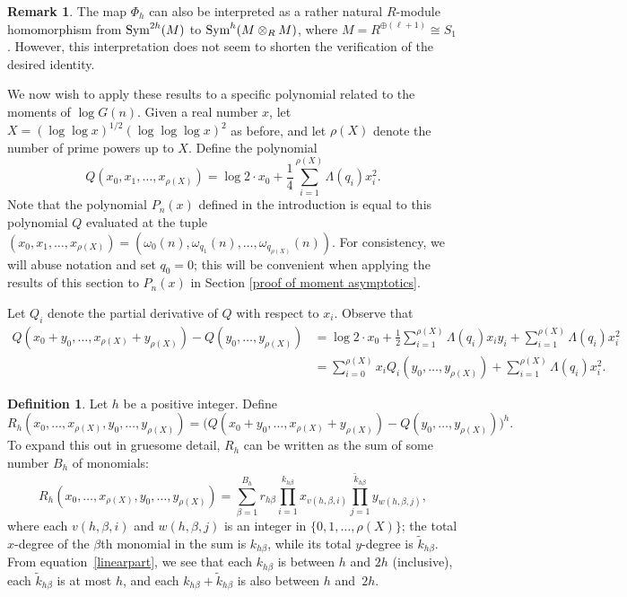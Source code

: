 \documentclass[12pt,reqno]{amsart}
\theoremstyle{definition}
\newtheorem{definition}[theorem]{Definition}
\newtheorem*{remark}{Remark}
\begin{document}
\begin{remark}
\newcommand{\Sym}{\mathop{\rm Sym}}
The map $\Phi_h$ can also be interpreted as a rather natural $R$-module homomorphism from $\Sym^{2h}(M)$ to $\Sym^h(M\otimes_R M)$, where $M = R^{\oplus(\ell+1)} \cong S_1$. However, this interpretation does not seem to shorten the verification of the desired identity.
\end{remark}

We now wish to apply these results to a specific polynomial related to the moments of $\log G(n)$.
Given a real number $x$, let $X=(\log\log x)^{1/2}(\log\log\log x)^2$ as before, and let $\rho(X)$ denote the number of prime powers up to $X$. Define the polynomial
\[
Q(x_0, x_1, \ldots, x_{\rho(X)}) = \log 2 \cdot x_0 + \frac{1}{4}\sum_{i=1}^{\rho(X)} \Lambda(q_i)x_i^2.
\]
Note that the polynomial $P_n(x)$ defined in the introduction is equal to this polynomial $Q$ evaluated at the tuple $(x_0, x_1, \ldots, x_{\rho(X)}) = (\omega_0(n), \omega_{q_1}(n), \ldots, \omega_{q_{\rho(X)}}(n))$. For consistency, we will abuse notation and set $q_0 = 0$; this will be convenient when applying the results of this section to $P_n(x)$ in Section \ref{proof of moment asymptotics}.

Let $Q_i$ denote the partial derivative of $Q$ with respect to $x_i$. Observe that
\begin{align}\label{linearpart}
Q(x_0+y_0,\dots,x_{\rho(X)}+y_{\rho(X)}) - Q(y_0,\dots,y_{\rho(X)}) &= \log 2 \cdot x_0 + \frac{1}{2} \sum_{i=1}^{\rho(X)} \Lambda(q_i)x_i y_i + \sum_{i=1}^{\rho(X)} \Lambda(q_i)x_i^2 \nonumber \\ &= \sum_{i = 0}^{\rho(X)} x_iQ_i(y_0, \ldots, y_{\rho(X)}) + \sum_{i=1}^{\rho(X)} \Lambda(q_i)x_i^2.
\end{align}

\begin{definition} \label{Rh def}
Let $h$ be a positive integer. Define
\[
R_h(x_0,\dots,x_{\rho(X)},y_0,\dots,y_{\rho(X)}) = \big( Q(x_0+y_0,\dots,x_{\rho(X)}+y_{\rho(X)}) - Q(y_0,\dots,y_{\rho(X)}) \big)^h.
\]
To expand this out in gruesome detail, $R_h$ can be written as the sum of some number $B_h$ of monomials:
\begin{equation} \label{Rh expanded}
R_h(x_0,\dots,x_{\rho(X)},y_0,\dots,y_{\rho(X)}) = \sum_{\beta=1}^{B_h} r_{h\beta} \prod_{i=1}^{k_{h\beta}} x_{v(h,\beta, i)} \prod_{j=1}^{\tilde k_{h\beta}} y_{w(h,\beta, j)},
\end{equation}
where each $v(h,\beta, i)$ and $w(h,\beta, j)$ is an integer in $\{0, 1, \dots,{\rho(X)}\}$; the total $x$-degree of the $\beta$th monomial in the sum is $k_{h\beta}$, while its total $y$-degree is $\tilde k_{h\beta}$. From equation~\eqref{linearpart}, we see that each $k_{h\beta}$ is between $h$ and $2h$ (inclusive), each $\tilde k_{h\beta}$ is at most $h$, and each $k_{h\beta}+\tilde k_{h\beta}$ is also between $h$ and~$2h$.
\end{definition}
\end{document}
